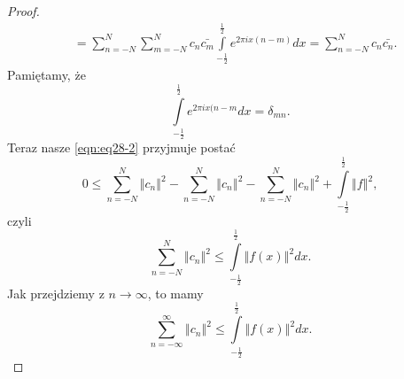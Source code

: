 \documentclass[../main.tex]{subfiles}
\begin{document}
\begin{proof}
\begin{align*}
        &=\sum_{n=-N}^{N} \sum_{m = -N}^{N} c_n \bar{c_m} \int\limits_{-\frac{1}{2}}^{\frac{1}{2}} e^{2\pi i x (n-m)} dx = \sum_{n=-N}^{N} c_n \bar{c_n}
    .\end{align*}
    Pamiętamy, że
    \[
        \int\limits_{-\frac{1}{2}}^{\frac{1}{2}} e^{2\pi i x(n-m}dx = \delta_{mn}
    .\]
Teraz nasze \eqref{eqn:eq28-2} przyjmuje postać
\[
    0 \le \sum_{n=-N}^{N} \left\Vert c_n \right\Vert^2 - \sum_{n=-N}^{N} \left\Vert c_n \right\Vert ^2 - \sum_{n=-N}^{N} \left\Vert c_n \right\Vert ^2 + \int\limits_{-\frac{1}{2}}^{\frac{1}{2}} \left\Vert f \right\Vert^2
,\]
czyli
\[
    \sum_{n=-N}^{N} \left\Vert c_n \right\Vert ^2 \le \int\limits_{-\frac{1}{2}}^{\frac{1}{2}} \left\Vert f(x) \right\Vert ^2 dx
.\]
Jak przejdziemy z $n\to \infty$, to mamy
\[
    \sum_{n=-\infty}^{\infty} \left\Vert c_n \right\Vert ^2 \le \int\limits_{-\frac{1}{2}}^{\frac{1}{2}} \left\Vert f(x) \right\Vert^2 dx
.\]
\end{proof}
\end{document}
